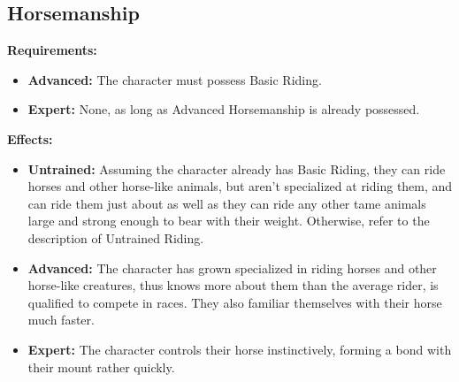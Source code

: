 \subsection{Horsemanship}
\begin{table}[!ht]
\centering
{}
\end{table}
\textbf{Requirements:}
\begin{itemize}
	\item \textbf{Advanced:} The character must possess Basic Riding.
	\item \textbf{Expert:} None, as long as Advanced Horsemanship is already possessed.
\end{itemize}
\textbf{Effects:}
\begin{itemize}
	\item \textbf{Untrained:} Assuming the character already has Basic Riding, they can ride horses and other horse-like animals, but aren't specialized at riding them, and can ride them just about as well as they can ride any other tame animals large and strong enough to bear with their weight. Otherwise, refer to the description of Untrained Riding.
	\item \textbf{Advanced:} The character has grown specialized in riding horses and other horse-like creatures, thus knows more about them than the average rider, is qualified to compete in races. They also familiar themselves with their horse much faster.
	\item \textbf{Expert:} The character controls their horse instinctively, forming a bond with their mount rather quickly.
\end{itemize}
